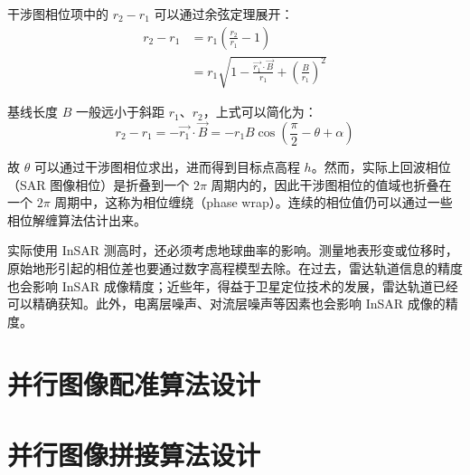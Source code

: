 干涉图相位项中的 $ r_2 - r_1 $ 可以通过余弦定理展开：
\begin{equation}
\begin{split}
    r_2 - r_1 &= r_1 (\frac{r_2}{r_1} - 1) \\
              &= r_1 \sqrt{1- \frac{\vec{r_1} \cdot \vec{B}}{r_1} + (\frac{B}{r_1})^2}
\end{split}
\end{equation}

基线长度 $B$ 一般远小于斜距 $r_1$、$r_2$，上式可以简化为：
\begin{equation}
    r_2 - r_1 = - \vec{r_1} \cdot \vec{B} = - r_1 B \cos(\frac{\pi}{2} - \theta + \alpha)
\end{equation}

故 $\theta$ 可以通过干涉图相位求出，进而得到目标点高程 $h$。然而，实际上回波相位（SAR 图像相位）是折叠到一个 $2\pi$ 周期内的，因此干涉图相位的值域也折叠在一个 $2\pi$ 周期中，这称为相位缠绕（phase wrap）。连续的相位值仍可以通过一些相位解缠算法估计出来。

实际使用 InSAR 测高时，还必须考虑地球曲率的影响。测量地表形变或位移时，原始地形引起的相位差也要通过数字高程模型去除。在过去，雷达轨道信息的精度也会影响 InSAR 成像精度；近些年，得益于卫星定位技术的发展，雷达轨道已经可以精确获知。此外，电离层噪声、对流层噪声等因素也会影响 InSAR 成像的精度。


\section{并行图像配准算法设计}

\section{并行图像拼接算法设计}
